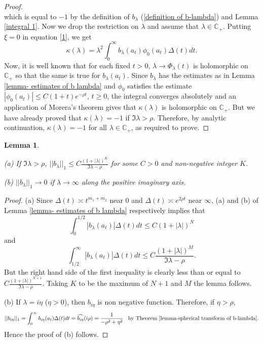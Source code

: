 \documentclass[11pt,reqno]{amsart}
\newcommand{\what}{\widehat}%
\newtheorem{lemma}[theorem]{Lemma}
\theoremstyle{definition}
\theoremstyle{definition}
\numberwithin{equation}{section}
\begin{document}
\begin{proof}
$$$$ 
which is equal to $-1$ by the definition of $b_\lambda$ (\ref{definition of b-lambda}) and Lemma \ref{integral 1}. Now we drop the restriction on $\lambda$ and assume that $\lambda\in \mathbb{C}_+$. Putting $\xi=0$ in equation \ref{1}, we get 
$$
\kappa(\lambda)=\lambda^2\int_0^\infty b_\lambda(a_t)\phi_0(a_t)\Delta(t)dt.
$$
Now, it is well known that for each fixed $t>0$, $\lambda\rightarrow\Phi_\lambda(t)$ is holomorphic on $\mathbb{C}_+$ so that the same is true for $b_\lambda(a_t)$. Since $b_\lambda$ has the estimates as in Lemma \ref{lemma- estimates of b lambda} and $\phi_0$ satisfies the estimate $|\phi_0(a_t)|\leq C(1+t)e^{-\rho t}$, $t\geq 0$, the integral converges absolutely and an application of Morera's theorem gives that $\kappa(\lambda)$ is holomorphic on $\mathbb{C}_+$. But we have already proved that $\kappa(\lambda)=-1$ if $\Im\lambda>\rho$. Therefore, by analytic continuation, $\kappa(\lambda)=-1$ for all $\lambda\in \mathbb{C}_+$, as required to prove.
\end{proof}



\begin{lemma}\label{lemma- L-1 norm of b-lambda}


\noindent (a) If $\Im\lambda>\rho$,
$
||b_\lambda||_1\leq C\frac{(1+|\lambda|)^K}{\Im\lambda-\rho}
$ for some $C>0$ and non-negative integer $K$.

(b) $||b_\lambda||_1\rightarrow 0$ if $\lambda\rightarrow \infty$ along the positive imaginary axis.
\end{lemma}
\begin{proof}
(a)
Since $\Delta(t)\asymp t^{m_1+m_2}$ near $0$ and $\Delta(t)\asymp e^{2\rho t}$ near $\infty$, (a) and (b) of Lemma \ref{lemma- estimates of b lambda} respectively implies that 
$$
\int_0^{1/2}|b_\lambda(a_t)|\Delta(t)dt\leq C(1+|\lambda|)^N
$$
and 
$$
\int_{1/2}^\infty |b_\lambda(a_t)|\Delta(t)
dt\leq C\frac{(1+|\lambda|)^M}{\Im\lambda-\rho}.
$$
But the right hand side of the first inequality is clearly less than or equal to $C\frac{(1+|\lambda|)^{N+1}}{\Im\lambda-\rho}$. Taking $K$ to be the maximum of $N+1$ and $M$ the lemma follows.


\noindent (b) If $\lambda=i\eta$ ($\eta>0$),  then $b_{i\eta}$ is non negative function. Therefore, if $\eta>\rho$,
 $$
||b_{i\eta}||_1=\int_0^\infty b_{i\eta}(a_t)\Delta(t)dt=\what{b_{i\eta}}(i\rho)=\frac{1}{-\rho^2+\eta^2}\hspace{3mm}\textup{by Theorem}\hspace{1mm}\ref{lemma-spherical transform of b-lambda}.
$$ 
Hence the proof of (b) follows.
\end{proof}
\end{document}
